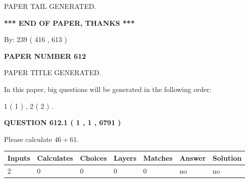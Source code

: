 \documentclass[12pt]{article}
\begin{document}
   
   
   
   
   
 \vspace{0.2in}
 
   
   
\vspace{2.0in} PAPER TAIL GENERATED.
   
   
   
   
\vspace{1.0in} 
{\textbf{\large{ *** END OF PAPER, THANKS *** }}} 
   
   
\hspace{1.0in} By: 
 239 ( 416 ,  613 )
   
   
   
   
\newpage 
\setcounter{page}{ 
   612001 } 
   
   
   
   
 {\textbf{ \Large{ PAPER NUMBER  612  }}}
   
   
\vspace{0.2in}
   
   
   
   
   
   
   
   
 \vspace{0.2in}
 
 
 
 
   
   
 PAPER TITLE GENERATED.
   
   
   
\vspace{0.2in}
   
In this paper, big questions will be generated in the following order: 
   
   
   1 ( 1 )
 ,
   2 ( 2 )
 .
  
\vspace{0.2in}
  
{\textbf{\Large{QUESTION
612.1 
 ( 1 , 1 , 6791 )
}}}
  
  
 
Please calculate $ %
46 +  %
61 $.
 
 
   
   
   
   
\noindent\begin{tabular}{|l|l|l|l|l|l|l|}
 \hline
Inputs & Calculates & Choices & Layers & Matches & Answer & Solution \\ \hline
 2  & 
 0  & 
 0
  & 
 0  & 
 0  & 
  no & 
  no 
  \\ \hline
 \end{tabular}
   
\end{document}
